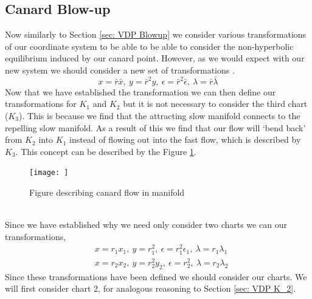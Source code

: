 \documentclass{article}
\begin{document}
\subsection{Canard Blow-up}
Now similarly to Section \ref{sec: VDP Blowup} we consider various transformations of our coordinate system to be able to be able to consider the non-hyperbolic equilibrium induced by our canard point. However, as we would expect with our new system we should consider a new set of transformations \citep{krupa2001}.
\begin{equation}
    x=\bar{r}\bar{x}, \ y=\bar{r}^2y, \ \epsilon=\bar{r}^2\bar{\epsilon}, \ \lambda=\bar{r}\bar{\lambda}
\end{equation}
Now that we have established the transformation we can then define our transformations for $K_1$ and $K_2$ but it is not necessary to consider the third chart ($K_3$). This is because we find that the attracting slow manifold connects to the repelling slow manifold. As a result of this we find that our flow will `bend back' from $K_2$ into $K_1$ instead of flowing out into the fast flow, which is described by $K_3$. This concept can be described by the Figure \ref{fig: flow in canard}.
\begin{figure}[h!]
    \centering
    \texttt{[image: ]}
    \caption{Figure describing canard flow in manifold}
    \label{fig: flow in canard}
\end{figure}

\\
Since we have established why we need only consider two charts we can our transformations,
\begin{subequations}
    \begin{align}
        &x=r_1x_1, \ y=r_1^2, \ \epsilon=r_1^2\epsilon_1, \ \lambda=r_1\lambda_1 \label{eq: coordiante K_1}\\ 
        &x=r_2x_2, \ y=r_2^2y_2, \ \epsilon=r^2_2, \ \lambda=r_2\lambda_2 \label{eq: coordinate K_2}
    \end{align}
\end{subequations}
Since these transformations have been defined we should consider our charts. We will first consider chart 2, for analogous reasoning to Section \ref{sec: VDP K_2}. 
\end{document}
